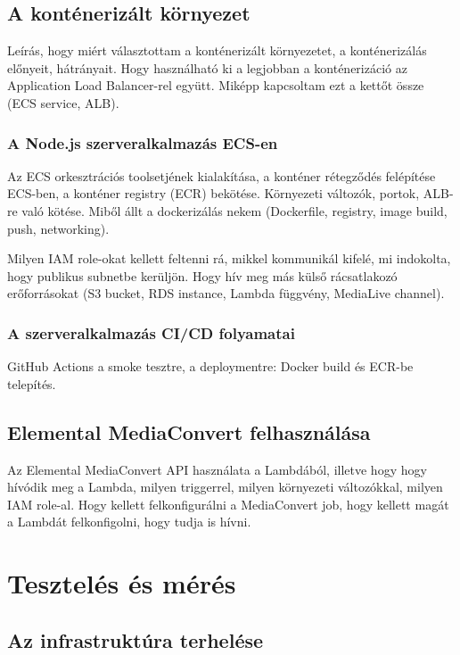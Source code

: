 \section{A konténerizált környezet}

Leírás, hogy miért választottam a konténerizált környezetet, a konténerizálás előnyeit, hátrányait. Hogy használható ki a legjobban a konténerizáció az Application Load Balancer-rel együtt. Miképp kapcsoltam ezt a kettőt össze (ECS service, ALB).

\subsection{A Node.js szerveralkalmazás ECS-en}

Az ECS orkesztrációs toolsetjének kialakítása, a konténer rétegződés felépítése ECS-ben, a konténer registry (ECR) bekötése. Környezeti változók, portok, ALB-re való kötése. Miből állt a dockerizálás nekem (Dockerfile, registry, image build, push, networking).

Milyen IAM role-okat kellett feltenni rá, mikkel kommunikál kifelé, mi indokolta, hogy publikus subnetbe kerüljön. Hogy hív meg más külső rácsatlakozó erőforrásokat (S3 bucket, RDS instance, Lambda függvény, MediaLive channel).

\subsection{A szerveralkalmazás CI/CD folyamatai}

GitHub Actions a smoke tesztre, a deploymentre: Docker build és ECR-be telepítés.

\section{Elemental MediaConvert felhasználása}

Az Elemental MediaConvert API használata a Lambdából, illetve hogy hogy hívódik meg a Lambda, milyen triggerrel, milyen környezeti változókkal, milyen IAM role-al. Hogy kellett felkonfigurálni a MediaConvert job, hogy kellett magát a Lambdát felkonfigolni, hogy tudja is hívni.

\chapter{Tesztelés és mérés}

\section{Az infrastruktúra terhelése}


